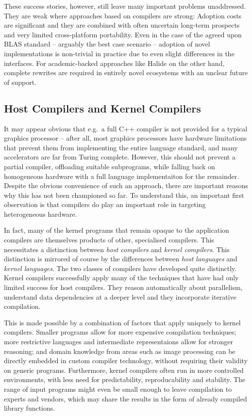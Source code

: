     These success stories, however, still leave many important problems
    unaddressed.
    They are weak where approaches based on compilers are strong:
    Adoption costs are significant and they are combined with often uncertain
    long-term prospects and very limited cross-platform portability.
    Even in the case of the agreed upon BLAS standard -- arguably the best case
    scenario -- adoption of novel implementations is non-trivial in practice due
    to even slight differences in the interfaces.
    For academic-backed approaches like Halide on the other hand, complete
    rewrites are required in entirely novel ecosystems with an unclear future of
    support.

    \subsection*{Host Compilers and Kernel Compilers}

    It may appear obvious that e.g.\ a full C++ compiler is not provided for a
    typical graphics processor -- after all, most graphics processors have
    hardware limitations that prevent them from implementing the entire language
    standard, and many accelerators are far from Turing complete.
    However, this should not prevent a partial compiler, offloading suitable
    subprograms, while falling back on homogeneous hardware with a full language
    implementaiton for the remainder.
    Despite the obvious convenience of such an approach, there are important
    reasons why this has not been championed so far.
    To understand this, an important first observation is that compilers do play
    an important role in targeting heterogeneous hardware.

    In fact, many of the kernel programs that remain opaque to the application
    compilers are themselves products of other, specialised compilers.
    This necessitates a distinction between {\em host compilers} and {\em kernel
    compilers}.
    This distinction is mirrored of course by the differences between {\em host
    languages} and {\em kernel languages}.
    The two classes of compilers have developed quite distinctly.
    Kernel compilers successfully apply many of the techniques that have had
    only limited success for host compilers.
    They reason automatically about parallelism, understand data dependencies at
    a deeper level and they incorporate iterative compilation.

    This is made possible by a combination of factors that apply uniquely to
    kernel compilers.
    Smaller programs allow for more expensive compilation techniques;
    more restrictive languages and intermediate representaions allow for
    stronger reasoning;
    and domain knowledge from areas such as image processing can be directly
    embedded in custom compiler technology, without requiring their validity
    on generic programs.
    Furthermore, kernel compilers often run in more controlled environments,
    with less need for predictability, reproducability and stability.
    The range of input programs might even be small enough to leave compilation
    to experts and vendors, which may share the results in the form of already
    compiled library functions.

